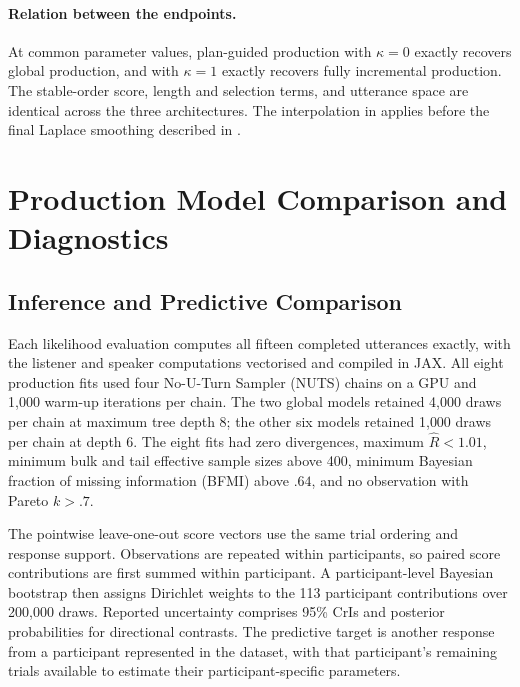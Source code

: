 \documentclass[10pt,a4paper,fleqn]{article}
\begin{document}
\paragraph{Relation between the endpoints.}
At common parameter values, plan-guided production with $\kappa=0$ exactly recovers global production, and with $\kappa=1$ exactly recovers fully incremental production.
The stable-order score, length and selection terms, and utterance space are identical across the three architectures.
The interpolation in  applies before the final Laplace smoothing described in .

\section{Production Model Comparison and Diagnostics}
\label{sec:appendix:model-diagnostics}

\subsection{Inference and Predictive Comparison}

Each likelihood evaluation computes all fifteen completed utterances exactly, with the listener and speaker computations vectorised and compiled in JAX.
All eight production fits used four No-U-Turn Sampler (NUTS) chains on a GPU and 1{,}000 warm-up iterations per chain.
The two global models retained 4{,}000 draws per chain at maximum tree depth 8; the other six models retained 1{,}000 draws per chain at depth 6.
The eight fits had zero divergences, maximum $\widehat R<1.01$, minimum bulk and tail effective sample sizes above 400, minimum Bayesian fraction of missing information (BFMI) above $.64$, and no observation with Pareto $k>.7$.

The pointwise leave-one-out score vectors use the same trial ordering and response support.
Observations are repeated within participants, so paired score contributions are first summed within participant.
A participant-level Bayesian bootstrap then assigns Dirichlet weights to the 113 participant contributions over 200{,}000 draws.
Reported uncertainty comprises 95\% CrIs and posterior probabilities for directional contrasts.
The predictive target is another response from a participant represented in the dataset, with that participant's remaining trials available to estimate their participant-specific parameters.
\end{document}
